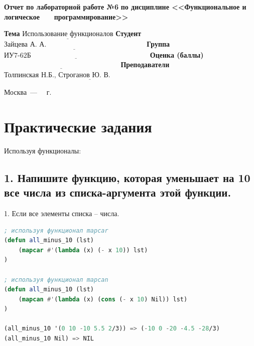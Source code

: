 \documentclass[12pt]{report}
\begin{document}
\begin{titlepage}
		\begin{center}
			\noindent\begin{minipage}{1.1\textwidth}\centering
				\Large\textbf{  Отчет по лабораторной работе №6}\newline
				\textbf{по дисциплине <<Функциональное и логическое}\newline
				\textbf{~~~программирование>>}\newline\newline
			\end{minipage}
		\end{center}
		
		\noindent\textbf{Тема} $\underline{\text{Использование функционалов}}$\newline\newline
		\noindent\textbf{Студент} $\underline{\text{Зайцева А. А.~~~~~~~~~~~~~~~~~~~~~~~~~~~~~~~~~~~~~~~~~~}}$\newline\newline
		\noindent\textbf{Группа} $\underline{\text{ИУ7-62Б~~~~~~~~~~~~~~~~~~~~~~~~~~~~~~~~~~~~~~~~~~~~~~~~~~}}$\newline\newline
		\noindent\textbf{Оценка (баллы)} $\underline{\text{~~~~~~~~~~~~~~~~~~~~~~~~~~~~~~~~~~~~~~~~~~~~~~~~~}}$\newline\newline
		\noindent\textbf{Преподаватели} $\underline{\text{Толпинская Н.Б., Строганов Ю. В.~~~~~~~~~~~~~~~~~~~~~~~~~~~~}}$\newline\newline\newline
		
		\begin{center}
			\vfill
			Москва~---~\the\year
			~г.
		\end{center}
	\end{titlepage}


\chapter*{Практические задания}	

Используя функционалы:


\section*{1. Напишите функцию, которая уменьшает на 10 все числа из списка-аргумента этой функции.}

1. Если все элементы списка -- числа. 
\begin{lstlisting}[language=Lisp]
; используя функционал mapcar
(defun all_minus_10 (lst)
	(mapcar #'(lambda (x) (- x 10)) lst)
)

; используя функционал mapcan
(defun all_minus_10 (lst)
	(mapcan #'(lambda (x) (cons (- x 10) Nil)) lst)
)

(all_minus_10 '(0 10 -10 5.5 2/3)) => (-10 0 -20 -4.5 -28/3)
(all_minus_10 Nil) => NIL
\end{lstlisting}
\end{document}
